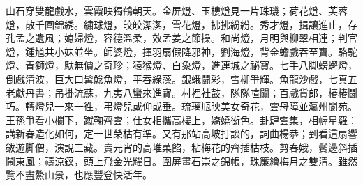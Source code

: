 \begin{myquote}
山石穿雙龍戲水，雲霞映獨鶴朝天。金屏燈、玉樓燈見一片珠璣；荷花燈、芙蓉燈，散千圍錦綉。繡球燈，皎皎潔潔，雪花燈，拂拂紛紛。秀才燈，揖讓進止，存孔孟之遺風；{}媳婦燈，容德溫柔，效孟姜之節操。和尚燈，月明與柳翠相連；判官燈，鍾馗共小妹並坐。師婆燈，揮羽扇假降邪神，劉海燈，背金蟾戲吞至寶。駱駝燈、青獅燈，馱無價之奇珍；猿猴燈、白象燈，進連城之祕寶。七手八脚螃蠏燈，倒戲清波，巨大口髯鯰魚燈，平吞綠藻。銀蛾鬪彩，雪柳爭輝。魚龍沙戲，七真五老獻丹書；吊掛流蘇，九夷八蠻來進寶。村裡社鼓，隊隊喧闐；百戲貨郎，樁樁鬪巧。轉燈兒一來一徃，弔燈兒或仰或垂。琉璃瓶映美女奇花，雲母障並瀛州閬苑。王孫爭看小欄下，蹴鞠齊雲；仕女相攜高樓上，嬌嬈衒色。卦肆雲集，相幄星羅：講新春造化如何，定一世榮枯有準。又有那站高坡打談的，詞曲楊恭；到看這扇響鈸遊脚僧，演說三藏。賣元宵的高堆菓餡，粘梅花的齊插枯枝。剪春娥，鬢邊斜插鬧東風；禱涼釵，頭上飛金光耀日。圍屏畫石崇之錦帳，珠簾繪梅月之雙清。雖然覽不盡鰲山景，也應豐登快活年。
\end{myquote}

